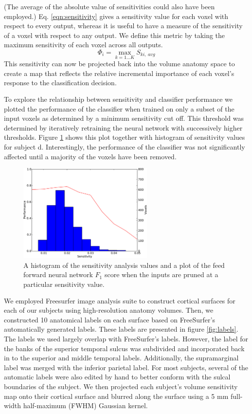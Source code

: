 \documentclass{article}
\begin{document}
(The average of the absolute value of sensitivities could also have been employed.)
Eq. \ref{eqn:sensitivity} gives a sensitivity value for each voxel with respect to every output, whereas it is useful to have a measure of the sensitivity of a voxel with respect to any output.
We define this metric by taking the maximum sensitivity of each voxel across all outputs.
\begin{equation}
\Phi_{i} = \max_{k=1 \dots K}{S_{ki,~avg}}
\end{equation}
This sensitivity can now be projected back into the volume anatomy space to create a  map that reflects the relative incremental importance of each voxel's response to the classification decision.

To  explore the relationship between sensitivity and classifier performance we plotted the performance of the classifier when trained on only a subset of the input voxels as determined by a minimum sensitivity cut off.
This threshold was determined by iteratively retraining the neural network with successively higher thresholds.
Figure \ref{fig:sensitivity-cutoff} shows this plot together with histogram of sensitivity values for subject d.
Interestingly, the performance of the classifier was not significantly affected until a majority of the voxels have been removed.

\begin{figure}
\centering
\includegraphics[width=0.6\textwidth]{figures/performance-verse-sensitivity-cutoff}
\caption{A histogram of the sensitivity analysis values and a plot of the feed forward neural network $F_1$ score when the inputs are pruned at a particular sensitivity value. }
\label{fig:sensitivity-cutoff}
\end{figure}

We employed Freesurfer image analysis suite to construct cortical surfaces for each of our subjects using high-resolution anatomy volumes.
Then, we constructed 10 anatomical labels on each surface based on FreeSurfer's automatically generated labels.
These labels are presented in figure \ref{fig:labels}.
The labels we used largely overlap with FreeSurfer's labels.
However, the label for the banks of the superior temporal sulcus was subdivided and incorporated back in to the superior and middle temporal labels.
Additionally, the supramarginal label was merged with the inferior parietal label.
For most subjects, several of the automatic labels were also edited by hand to better conform with the sulcal boundaries of the subject.
We then projected each subject's volume sensitivity map onto their cortical surface and blurred along the surface using a 5 mm full-width half-maximum (FWHM) Gaussian kernel.
\end{document}
